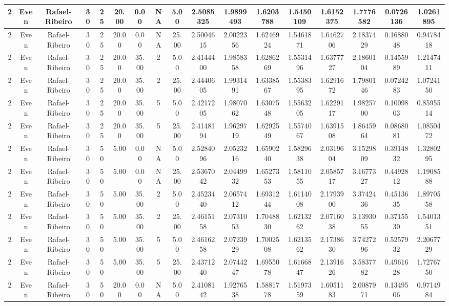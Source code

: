 \documentclass[a4paper]{article}
\begin{document}
\begin{center}
\begin{tabular}{ | c | c | c | c | c | c | c | c | c | c | c | c | c | c | c | c | c | }
		\hline
		2	&	Even	&	Rafael-Ribeiro	&	30	&	25	&	20.00	&	0.00	&	NA	&	5.00	&	2.5085325	&	1.9899493	&	1.6203788	&	1.5450109	&	1.6152375	&	1.7776582	&	0.0726136	&	1.0261895 \\
		\hline
		2	&	Even	&	Rafael-Ribeiro	&	30	&	25	&	20.00	&	0.00	&	NA	&	25.00	&	2.5004615	&	2.0022356	&	1.6246924	&	1.5461871	&	1.6462706	&	2.1837429	&	0.1688048	&	0.9478418 \\
		\hline
		2	&	Even	&	Rafael-Ribeiro	&	30	&	25	&	20.00	&	35.00	&	2	&	5.00	&	2.4144400	&	1.9858358	&	1.6286269	&	1.5531496	&	1.6377727	&	2.1860104	&	0.1455989	&	1.2147411 \\
		\hline
		2	&	Even	&	Rafael-Ribeiro	&	30	&	25	&	20.00	&	35.00	&	2	&	25.00	&	2.4440605	&	1.9931491	&	1.6338567	&	1.5538395	&	1.6291672	&	1.7980146	&	0.0724283	&	1.0724150 \\
		\hline
		2	&	Even	&	Rafael-Ribeiro	&	30	&	25	&	20.00	&	35.00	&	5	&	5.00	&	2.4217205	&	1.9807062	&	1.6307548	&	1.5563205	&	1.6229117	&	1.9825700	&	0.1009803	&	0.8595514 \\
		\hline
		2	&	Even	&	Rafael-Ribeiro	&	30	&	25	&	20.00	&	35.00	&	5	&	25.00	&	2.4148194	&	1.9629719	&	1.6292549	&	1.5574067	&	1.6391508	&	1.8645964	&	0.0868081	&	1.0850472 \\
		\hline
		2	&	Even	&	Rafael-Ribeiro	&	30	&	50	&	5.00	&	0.00	&	NA	&	5.00	&	2.5284096	&	2.0523216	&	1.6590240	&	1.5829638	&	2.0319604	&	3.1529809	&	0.3914832	&	1.3280295 \\
		\hline
		2	&	Even	&	Rafael-Ribeiro	&	30	&	50	&	5.00	&	0.00	&	NA	&	25.00	&	2.5367042	&	2.0449932	&	1.6527353	&	1.5811055	&	2.0585717	&	3.1677327	&	0.4492812	&	1.1908588 \\
		\hline
		2	&	Even	&	Rafael-Ribeiro	&	30	&	50	&	5.00	&	35.00	&	2	&	5.00	&	2.4523440	&	2.0657412	&	1.6931244	&	1.6114008	&	2.1793900	&	3.3742436	&	0.4513635	&	1.8970558 \\
		\hline
		2	&	Even	&	Rafael-Ribeiro	&	30	&	50	&	5.00	&	35.00	&	2	&	25.00	&	2.4615158	&	2.0731053	&	1.7048830	&	1.6213262	&	2.0716038	&	3.1393055	&	0.3715530	&	1.5401351 \\
		\hline
		2	&	Even	&	Rafael-Ribeiro	&	30	&	50	&	5.00	&	35.00	&	5	&	5.00	&	2.4616258	&	2.0723929	&	1.7002508	&	1.6213562	&	2.1738630	&	3.7427296	&	0.5257932	&	2.2067729 \\
		\hline
		2	&	Even	&	Rafael-Ribeiro	&	30	&	50	&	5.00	&	35.00	&	5	&	25.00	&	2.4371240	&	2.0744247	&	1.6955078	&	1.6166847	&	2.1391626	&	3.5837782	&	0.4961628	&	1.7276750 \\
		\hline
		2	&	Even	&	Rafael-Ribeiro	&	30	&	50	&	20.00	&	0.00	&	NA	&	5.00	&	2.4108142	&	1.9276538	&	1.5881778	&	1.5197359	&	1.6051183	&	2.0087971	&	0.1349506	&	0.9714984 \\

\end{tabular}
\end{center}
\end{document}
